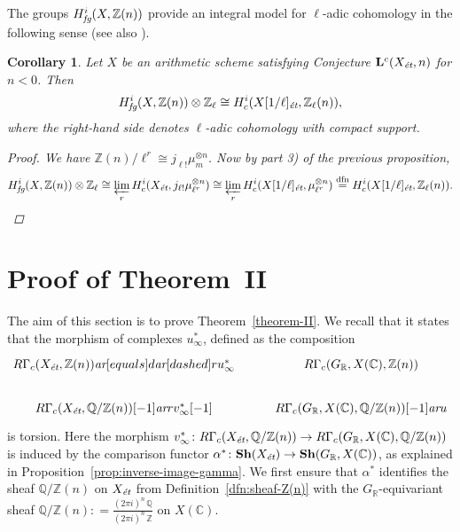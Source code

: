 \documentclass[leqno,12pt]{article}
\theoremstyle{plain}
\newtheorem{corollary}[theorem]{\indent\sc Corollary}
\theoremstyle{definition}
\newcommand{\CC}{\mathbb{C}}
\newcommand{\QQ}{\mathbb{Q}}
\newcommand{\RR}{\mathbb{R}}
\newcommand{\ZZ}{\mathbb{Z}}
\newcommand{\dfn}{\mathrel{\mathop:}=}
\newcommand{\ar}{\text{\it ar}}
\newcommand{\et}{\text{\it \'{e}t}}
\newcommand{\fg}{\text{\it fg}}
\begin{document}
The groups $H_\fg^i (X, \ZZ (n))$ provide an integral model for $\ell$-adic
cohomology in the following sense (see also \cite[\S 8]{Geisser-2004}).

\begin{corollary}
  \label{cor:RGamma-fg-model-for-l-adic-cohomology}
  Let $X$ be an arithmetic scheme satisfying Conjecture
  $\mathbf{L}^c (X_\et, n)$ for $n < 0$. Then
  $$H_\fg^i (X, \ZZ (n)) \otimes \ZZ_\ell \cong H^i_c (X [1/\ell]_\et, \ZZ_\ell (n)),$$
  where the right-hand side denotes $\ell$-adic cohomology with compact support.

  \begin{proof}
    We have $\ZZ (n)/\ell^r \cong j_{\ell!} \mu_m^{\otimes n}$.
    Now by part 3) of the previous proposition,
    \[ H_\fg^i (X, \ZZ (n)) \otimes \ZZ_\ell \cong
      \varprojlim_r H_c^i (X_\et, j_{\ell!} \mu_{\ell^r}^{\otimes n}) \cong
      \varprojlim_r H_c^i (X [1/\ell]_\et, \mu_{\ell^r}^{\otimes n})
      \stackrel{\text{dfn}}{=} H_c^i (X [1/\ell]_\et, \ZZ_\ell (n)). \qedhere \]
  \end{proof}
\end{corollary}


\section{Proof of Theorem~II}
\label{sec:theorem-II}

The aim of this section is to prove Theorem~\ref{theorem-II}. We recall that it
states that the morphism of complexes $u_\infty^*$, defined as the composition
\[ \begin{tikzcd}
  R\Gamma_c (X_\et, \ZZ(n)) \ar[equals]{d}\ar[dashed]{r}{u_\infty^*} & R\Gamma_c (G_\RR, X (\CC), \ZZ (n)) \\
  R\Gamma_c (X_\et, \QQ/\ZZ (n)) [-1] \ar{r}{v_\infty^* [-1]} & R\Gamma_c (G_\RR, X (\CC), \QQ/\ZZ (n)) [-1] \ar{u}
\end{tikzcd} \]
is torsion. Here the morphism
$v_\infty^*\colon R\Gamma_c (X_\et, \QQ/\ZZ (n)) \to R\Gamma_c (G_\RR, X (\CC), \QQ/\ZZ (n))$
is induced by the comparison functor
$\alpha^*\colon \mathbf{Sh} (X_\et) \to \mathbf{Sh} (G_\RR, X (\CC))$, as
explained in Proposition~\ref{prop:inverse-image-gamma}. We first ensure that
$\alpha^*$ identifies the sheaf $\QQ/\ZZ (n)$ on $X_\et$ from
Definition~\ref{dfn:sheaf-Z(n)} with the $G_\RR$-equivariant sheaf
$\QQ/\ZZ (n) \dfn \frac{(2\pi i)^n\,\QQ}{(2\pi i)^n\,\ZZ}$ on $X (\CC)$.
\end{document}
